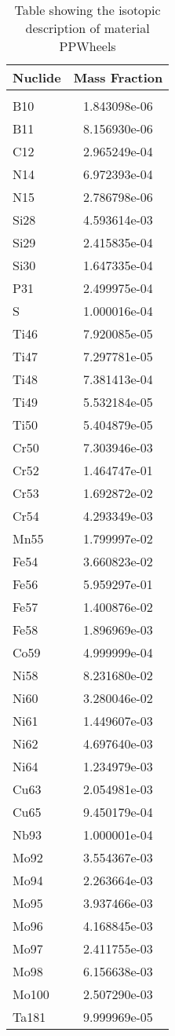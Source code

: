 \begin{centering}
\begin{table}[ht!]
\begin{tabular}{l | c}
\hline
Nuclide & Mass Fraction\\
\hline
\\
B10 & 1.843098e-06\\
B11 & 8.156930e-06\\
C12 & 2.965249e-04\\
N14 & 6.972393e-04\\
N15 & 2.786798e-06\\
Si28 & 4.593614e-03\\
Si29 & 2.415835e-04\\
Si30 & 1.647335e-04\\
P31 & 2.499975e-04\\
S & 1.000016e-04\\
Ti46 & 7.920085e-05\\
Ti47 & 7.297781e-05\\
Ti48 & 7.381413e-04\\
Ti49 & 5.532184e-05\\
Ti50 & 5.404879e-05\\
Cr50 & 7.303946e-03\\
Cr52 & 1.464747e-01\\
Cr53 & 1.692872e-02\\
Cr54 & 4.293349e-03\\
Mn55 & 1.799997e-02\\
Fe54 & 3.660823e-02\\
Fe56 & 5.959297e-01\\
Fe57 & 1.400876e-02\\
Fe58 & 1.896969e-03\\
Co59 & 4.999999e-04\\
Ni58 & 8.231680e-02\\
Ni60 & 3.280046e-02\\
Ni61 & 1.449607e-03\\
Ni62 & 4.697640e-03\\
Ni64 & 1.234979e-03\\
Cu63 & 2.054981e-03\\
Cu65 & 9.450179e-04\\
Nb93 & 1.000001e-04\\
Mo92 & 3.554367e-03\\
Mo94 & 2.263664e-03\\
Mo95 & 3.937466e-03\\
Mo96 & 4.168845e-03\\
Mo97 & 2.411755e-03\\
Mo98 & 6.156638e-03\\
Mo100 & 2.507290e-03\\
Ta181 & 9.999969e-05
\end{tabular}
\caption{Table showing the isotopic description of material PPWheels}
\label{table:material_PPWheels}
\end{table}\clearpage


\end{centering}

